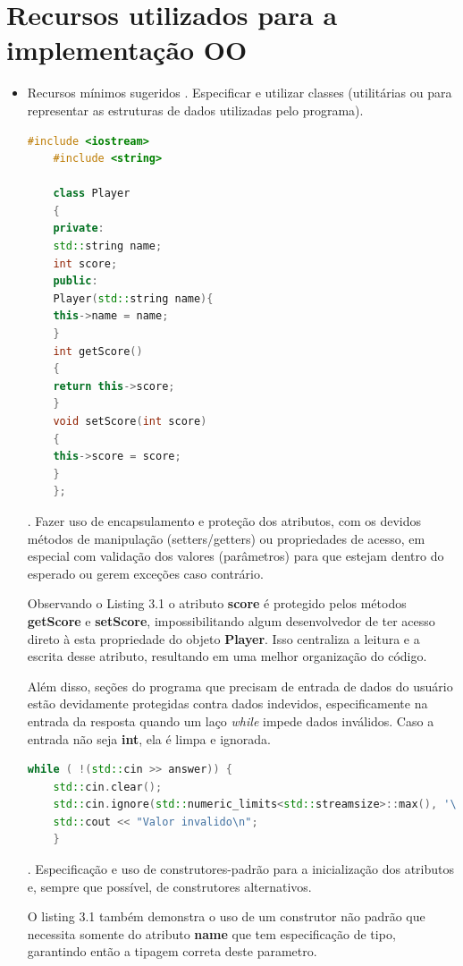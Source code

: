 \documentclass[rel_mlp]{iiufrgs}
\begin{document}
\section{Recursos utilizados para a implementação OO}
\begin{itemize}
	\item Recursos mínimos sugeridos
	. Especificar e utilizar classes (utilitárias ou para representar as estruturas de dados utilizadas pelo programa).
	\begin{lstlisting}[language=C++, caption={Exemplo de classe utilizada no programa}]
	#include <iostream>
	#include <string>
	
	class Player
	{
	private:
	std::string name;
	int score;
	public:
	Player(std::string name){
	this->name = name;
	}
	int getScore()
	{
	return this->score;
	}
	void setScore(int score)
	{
	this->score = score;
	}
	};
	\end{lstlisting}
	
	. Fazer uso de encapsulamento e proteção dos atributos, com os devidos métodos de manipulação (setters/getters) ou propriedades de acesso, em especial com validação dos valores (parâmetros) para que estejam dentro do esperado ou gerem exceções caso contrário.
	
	Observando o Listing 3.1 o atributo  \textbf{score} é protegido pelos métodos \textbf{getScore} e \textbf{setScore}, impossibilitando algum desenvolvedor de ter acesso direto à esta propriedade do objeto \textbf{Player}. Isso centraliza a leitura e a escrita desse atributo, resultando em uma melhor organização do código.
	
	Além disso, seções do programa que precisam de entrada de dados do usuário estão devidamente protegidas contra dados indevidos, especificamente na entrada da resposta quando um laço \textit{while} impede dados inválidos. Caso a entrada não seja \textbf{int}, ela é limpa e ignorada.
	
	\begin{lstlisting}[language=C++, caption={Proteção de dados inválidos}]
	while ( !(std::cin >> answer)) {
	std::cin.clear();
	std::cin.ignore(std::numeric_limits<std::streamsize>::max(), '\n');
	std::cout << "Valor invalido\n";
	}
	\end{lstlisting}
	
	. Especificação e uso de construtores-padrão para a inicialização dos atributos e, sempre que possível, de construtores alternativos.
	
	O listing 3.1 também demonstra o uso de um construtor não padrão que necessita somente do atributo \textbf{name} que tem especificação de tipo, garantindo então a tipagem correta deste parametro.
	

\end{itemize}
\end{document}
